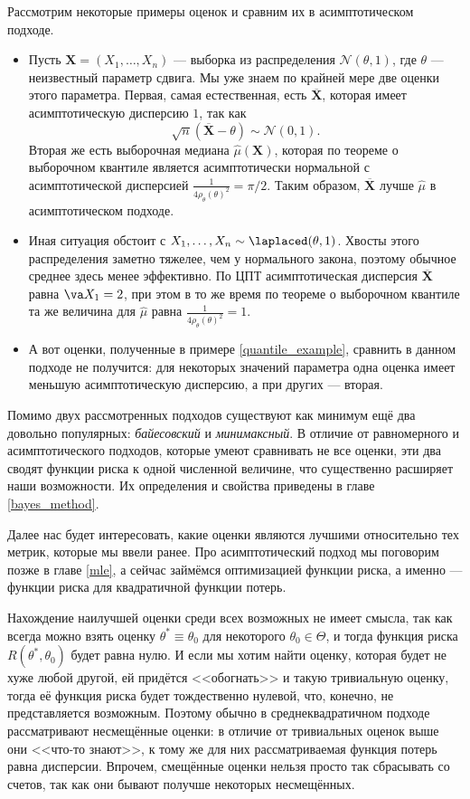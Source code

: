 \begin{example}
    Рассмотрим некоторые примеры оценок и сравним их в асимптотическом подходе.
    \begin{itemize}
        \item Пусть $\mathbf X = (X_1, \ldots, X_n)$ --- выборка из распределения $\mathcal{N}(\theta, 1)$, где $\theta$ --- неизвестный параметр сдвига. Мы уже знаем по крайней мере две оценки этого параметра. Первая, самая естественная, есть $\overline{\mathbf X}$, которая имеет асимптотическую дисперсию $1$, так как
        \[
        \sqrt{n}(\overline{\mathbf X} - \theta) \sim \mathcal{N}(0, 1).
        \]
        Вторая же есть выборочная медиана $\widehat{\mu}(\mathbf X)$, которая по теореме о выборочном квантиле является асимптотически нормальной с асимптотической дисперсией $\frac1{4\rho_{\theta}(\theta)^2} = \pi/2$. Таким образом, $\overline{\mathbf X}$ лучше $\widehat{\mu}$ в асимптотическом подходе.
        \item Иная ситуация обстоит с $X_1, \ldots, X_n \sim \laplaced(\theta, 1)$. Хвосты этого распределения заметно тяжелее, чем у нормального закона, поэтому обычное среднее здесь менее эффективно. По ЦПТ асимптотическая дисперсия $\overline{\mathbf X}$ равна $\va X_1 = 2$, при этом в то же время по теореме о выборочном квантиле та же величина для $\widehat{\mu}$ равна $\frac1{4\rho_{\theta}(\theta)^2} = 1$.
        \item А вот оценки, полученные в примере \ref{quantile_example}, сравнить в данном подходе не получится: для некоторых значений параметра одна оценка имеет меньшую асимптотическую дисперсию, а при других --- вторая.
    \end{itemize}
\end{example}

Помимо двух рассмотренных подходов существуют как минимум ещё два довольно популярных: \textit{байесовский} и \textit{минимаксный}. В отличие от равномерного и асимптотического подходов, которые умеют сравнивать не все оценки, эти два сводят функции риска к одной численной величине, что существенно расширяет наши возможности. Их определения и свойства приведены в главе \ref{bayes_method}.

Далее нас будет интересовать, какие оценки являются лучшими относительно тех метрик, которые мы ввели ранее. Про асимптотический подход мы поговорим позже в главе \ref{mle}, а сейчас займёмся оптимизацией функции риска, а именно --- функции риска для квадратичной функции потерь.

Нахождение наилучшей оценки среди всех возможных не имеет смысла, так как всегда можно взять оценку $\theta^* \equiv \theta_0$ для некоторого $\theta_0 \in \Theta$, и тогда функция риска $R(\theta^*, \theta_0)$ будет равна нулю. И если мы хотим найти оценку, которая будет не хуже любой другой, ей придётся <<обогнать>> и такую тривиальную оценку, тогда её функция риска будет тождественно нулевой, что, конечно, не представляется возможным. Поэтому обычно в среднеквадратичном подходе рассматривают несмещённые оценки: в отличие от тривиальных оценок выше они <<что-то знают>>, к тому же для них рассматриваемая функция потерь равна дисперсии. Впрочем, смещённые оценки нельзя просто так сбрасывать со счетов, так как они бывают получше некоторых несмещённых.

